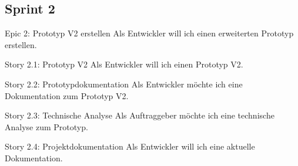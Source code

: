 \subsection{Sprint 2}

\begin{epic}{Epic 2: Prototyp V2 erstellen}
  Als Entwickler will ich einen erweiterten Prototyp erstellen.
\end{epic}

\begin{story}{Story 2.1:  Prototyp V2}
  Als Entwickler will ich einen Prototyp V2.
\end{story}

\begin{story}{Story 2.2:  Prototypdokumentation}
  Als Entwickler möchte ich eine Dokumentation zum Prototyp V2.
\end{story}

\begin{story}{Story 2.3:  Technische Analyse}
  Als Auftraggeber möchte ich eine technische Analyse zum Prototyp.
\end{story}

\begin{story}{Story 2.4:  Projektdokumentation}
  Als Entwickler will ich eine aktuelle Dokumentation.
\end{story}

